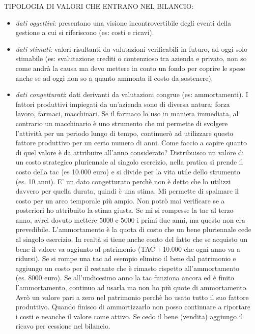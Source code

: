 TIPOLOGIA DI VALORI CHE ENTRANO NEL BILANCIO:

\begin{itemize}
\item
  \emph{dati oggettivi}: presentano una visione incontrovertibile degli
  eventi della gestione a cui si riferiscono (es: costi e ricavi).
\item
  \emph{dati stimati}: valori risultanti da valutazioni verificabili in
  futuro, ad oggi solo stimabile (es: svalutazione crediti o contenzioso
  tra azienda e privato, non so come andrà la causa ma devo mettere in
  conto un fondo per coprire le spese anche se ad oggi non so a quanto
  ammonta il costo da sostenere).
\item
  \emph{dati congetturati}: dati derivanti da valutazioni congrue (es:
  ammortamenti). I fattori produttivi impiegati da un'azienda sono di
  diversa natura: forza lavoro, farmaci, macchinari. Se il farmaco lo
  uso in maniera immediata, al contrario un macchinario è uno strumento
  che mi permette di svolgere l'attività per un periodo lungo di tempo,
  continuerò ad utilizzare questo fattore produttivo per un certo numero
  di anni. Come faccio a capire quanto di quel valore è da attribuire
  all'anno considerato? Distribuisco un valore di un costo strategico
  pluriennale al singolo esercizio, nella pratica si prende il costo
  della tac (es 10.000 euro) e si divide per la vita utile dello
  strumento (es. 10 anni). E' un dato congetturato perchè non è detto
  che lo utilizzi davvero per quella durata, quindi è una stima. Mi
  permette di spalmare il costo per un arco temporale più ampio. Non
  potrò mai verificare se a posteriori ho attribuito la stima giusta. Se
  mi si rompesse la tac al terzo anno, avrei dovuto mettere 5000 e 5000
  i primi due anni, ma questo non era prevedibile. L'ammortamento è la
  quota di costo che un bene pluriennale cede al singolo esercizio. In
  realtà si tiene anche conto del fatto che se acquisto un bene il
  valore va aggiunto al patrimonio (TAC +10.000 che ogni anno va a
  ridursi). Se si rompe una tac ad esempio elimino il bene dal
  patrimonio e aggiungo un costo per il restante che è rimasto rispetto
  all'ammortamento (es. 8000 euro). Se all'undicesimo anno la tac
  funziona ancora ed è finito l'ammortamento, continuo ad usarla ma non
  ho più quote di ammortamento. Avrò un valore pari a zero nel
  patrimonio perchè ho usato tutto il suo fattore produttivo. Quando
  finisco di ammortizzarlo non posso continuare a riportare i costi e
  neanche il valore come attivo. Se cedo il bene (vendita) aggiungo il
  ricavo per cessione nel bilancio.
\end{itemize}


